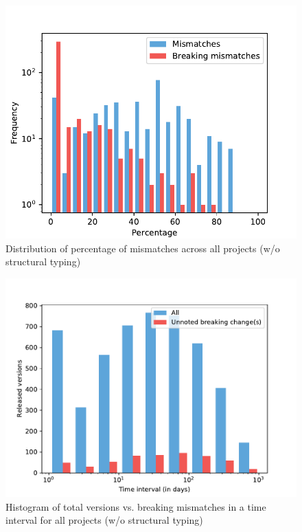 \documentclass{l4proj}
\begin{document}
\begin{appendices}
\begin{figure}[]
\centering
\caption{Distribution of percentage of mismatches across all projects
(w/o structural typing)}
\label{DistributionAllProjects}
\includegraphics[height=0.4\textheight]{images/evaluation/distribution_mismatches_all_projects}
\end{figure}

\begin{figure}[]
\centering
\caption{Histogram of total versions vs. breaking mismatches in a time
interval for all projects (w/o structural typing)}
\label{HistogramAllProjects}
\includegraphics[height=0.4\textheight]{images/evaluation/ls_nonstr_introduced_changes}
\end{figure}


\end{appendices}
\end{document}
